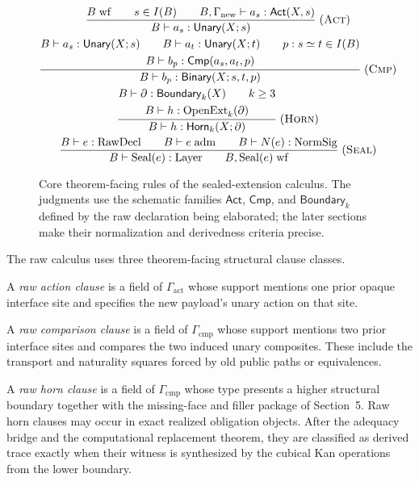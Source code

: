 \documentclass{lmcs}
\newcommand{\RawDecl}{\mathrm{RawDecl}}
\newcommand{\Layer}{\mathrm{Layer}}
\newcommand{\NormSig}{\mathrm{NormSig}}
\newcommand{\OpenExt}{\mathrm{OpenExt}}
\begin{document}
\begin{figure}[t]
\small
\[
\begin{array}{@{}c@{}}
\dfrac{
  B\;\mathrm{wf}
  \qquad s\in I(B)
  \qquad B,\Gamma_{\mathrm{new}}\vdash a_s:\mathsf{Act}(X,s)
}{
  B\vdash a_s:\mathsf{Unary}(X;s)
}
\;(\textsc{Act})
\\[2.2ex]
\dfrac{
  \begin{gathered}
  B\vdash a_s:\mathsf{Unary}(X;s)
  \qquad
  B\vdash a_t:\mathsf{Unary}(X;t)
  \qquad
  p:s\simeq t\in I(B)\\
  B\vdash b_p:\mathsf{Cmp}(a_s,a_t,p)
  \end{gathered}
}{
  B\vdash b_p:\mathsf{Binary}(X;s,t,p)
}
\;(\textsc{Cmp})
\\[2.2ex]
\dfrac{
  \begin{gathered}
  B\vdash \partial:\mathsf{Boundary}_k(X)
  \qquad k\geq 3\\
  B\vdash h:\OpenExt_k(\partial)
  \end{gathered}
}{
  B\vdash h:\mathsf{Horn}_k(X;\partial)
}
\;(\textsc{Horn})
\\[2.2ex]
\dfrac{
  B\vdash e:\RawDecl
  \qquad
  B\vdash e\;\mathrm{adm}
  \qquad
  B\vdash N(e):\NormSig
}{
  B\vdash \mathrm{Seal}(e):\Layer
  \qquad
  B,\mathrm{Seal}(e)\;\mathrm{wf}
}
\;(\textsc{Seal})
\end{array}
\]
\caption{Core theorem-facing rules of the sealed-extension calculus.  The
judgments use the schematic families \(\mathsf{Act}\), \(\mathsf{Cmp}\), and
\(\mathsf{Boundary}_k\) defined by the raw declaration being elaborated; the
later sections make their normalization and derivedness criteria precise.}
\label{fig:core-rules}
\end{figure}

\begin{defi}
The raw calculus uses three theorem-facing structural clause classes.

A \emph{raw action clause} is a field of \(\Gamma_{\mathrm{act}}\) whose support mentions one
prior opaque interface site and specifies the new payload's unary action on that site.

A \emph{raw comparison clause} is a field of \(\Gamma_{\mathrm{cmp}}\) whose support mentions
two prior interface sites and compares the two induced unary composites.  These include the
transport and naturality squares forced by old public paths or equivalences.

A \emph{raw horn clause} is a field of \(\Gamma_{\mathrm{cmp}}\) whose type presents a higher
structural boundary together with the missing-face and filler package of Section~5.  Raw horn
clauses may occur in exact realized obligation objects.  After the adequacy bridge and the
computational replacement theorem, they are classified as derived trace exactly when their
witness is synthesized by the cubical Kan operations from the lower boundary.
\end{defi}
\end{document}

